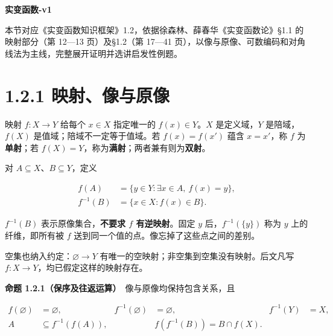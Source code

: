 \documentclass[11pt,a4paper]{article}
\begin{document}
\begin{center}
{\Large\bfseries 实变函数-v1\par}
\vspace{7pt}{\large 1.2 映射与基数\par}
\vspace{5pt}{第一章 集合与点集\par}
\end{center}
本节对应《实变函数知识框架》1.2，依据徐森林、薛春华《实变函数论》\S1.1 的映射部分（第 12—13 页）及\S1.2（第 17—41 页），以像与原像、可数编码和对角线法为主线，完整展开证明并选讲启发性例题。
\begingroup\setlength{\parskip}{0pt}\tableofcontents\endgroup

\section[\S{}1.2.1
映射、像与原像]{1.2.1
映射、像与原像}\label{ux6620ux5c04ux50cfux4e0eux539fux50cf}

映射 \(f:X\to Y\) 给每个 \(x\in X\) 指定唯一的 \(f(x)\in Y\)。\(X\)
是定义域，\(Y\) 是陪域，\(f(X)\) 是值域；陪域不一定等于值域。若
\(f(x)=f(x')\) 蕴含 \(x=x'\)，称 \(f\) 为\textbf{单射}；若
\(f(X)=Y\)，称为\textbf{满射}；两者兼有则为\textbf{双射}。

对 \(A\subseteq X\)、\(B\subseteq Y\)，定义

\begin{equation*}
\begin{aligned}
f(A)&=\{y\in Y:\exists x\in A,\ f(x)=y\},\\
f^{-1}(B)&=\{x\in X:f(x)\in B\}.
\end{aligned}\tag{1.2.1}
\end{equation*}

\(f^{-1}(B)\) 表示原像集合，\textbf{不要求 \(f\) 有逆映射}。固定 \(y\)
后，\(f^{-1}(\{y\})\) 称为 \(y\) 上的纤维，即所有被 \(f\)
送到同一个值的点。像忘掉了这些点之间的差别。

空集也纳入约定：\(\varnothing\to Y\)
有唯一的空映射；非空集到空集没有映射。后文凡写
\(f:X\to Y\)，均已假定这样的映射存在。

\textbf{命题 1.2.1（保序及往返运算）}　像与原像均保持包含关系，且

\begin{equation*}
\begin{aligned}
f(\varnothing)&=\varnothing,& f^{-1}(\varnothing)&=\varnothing,& f^{-1}(Y)&=X,\\
A&\subseteq f^{-1}(f(A)),&&f(f^{-1}(B))=B\cap f(X).
\end{aligned}\tag{1.2.2}
\end{equation*}
\end{document}
